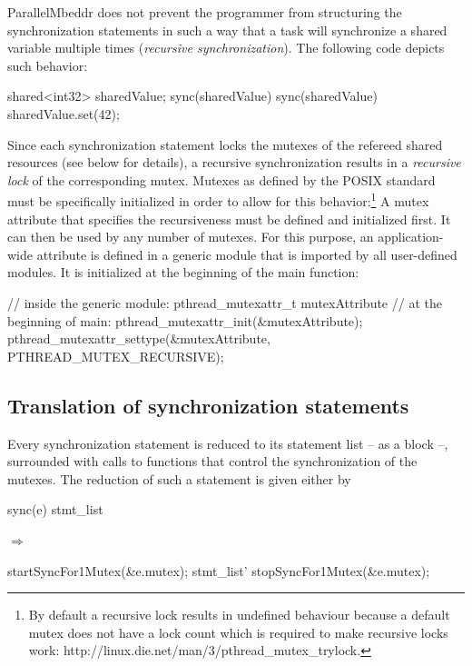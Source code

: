 ParallelMbeddr does not prevent the programmer from structuring the synchronization statements in such a way that a task will synchronize a shared variable multiple times (\textit{recursive synchronization}). The following code depicts such behavior:
\begin{ccode}
shared<int32> sharedValue;
sync(sharedValue) {
  sync(sharedValue) {
    sharedValue.set(42);
  }
}
\end{ccode}
Since each synchronization statement locks the mutexes of the refereed shared resources (see below for details), a recursive synchronization results in a \textit{recursive lock} of the corresponding mutex. Mutexes as defined by the POSIX standard must be specifically initialized in order to allow for this behavior:\footnote{By default a recursive lock results in undefined behaviour because a default mutex does not have a lock count which is required to make recursive locks work: http://linux.die.net/man/3/pthread\_mutex\_trylock.} A mutex attribute that specifies the recursiveness must be defined and initialized first. It can then be used by any number of mutexes. For this purpose, an application-wide attribute is defined in a generic module that is imported by all user-defined modules. It is initialized at the beginning of the main function:
\begin{ccode}
// inside the generic module:
pthread_mutexattr_t mutexAttribute
// at the beginning of main:
pthread_mutexattr_init(&mutexAttribute);
pthread_mutexattr_settype(&mutexAttribute, PTHREAD_MUTEX_RECURSIVE);
\end{ccode}

\subsection{Translation of synchronization statements}
Every synchronization statement is reduced to its statement list -- as a block --, surrounded with calls to functions that control the synchronization of the mutexes. The reduction of such a statement is given either by

\begin{center}
\begin{minipage}{0.3\textwidth}
\begin{ccode}
sync(e) stmt_list
\end{ccode}
\end{minipage}
\qquad$\Longrightarrow$\qquad\qquad\qquad
\begin{minipage}{0.4\textwidth}
\begin{ccode}
startSyncFor1Mutex(&e.mutex);
stmt_list'
stopSyncFor1Mutex(&e.mutex);
\end{ccode}
\end{minipage}
\end{center}

